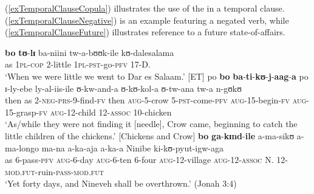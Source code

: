 \largerpage
(\ref{exTemporalClauseCopula}) illustrates the use of the  in a temporal clause. (\ref{exTemporalClauseNegative}) is an example featuring a negated verb, while (\ref{exTemporalClauseFuture}) illustrates reference to a future state-of-affairs.
\begin{exe}
\ex  \label{exTemporalClauseCopula} \gll \textbf{bo} \textbf{tʊ}-\textbf{lɪ} ba-niini tw-a-bʊʊk-ile kʊ-dalesalama\\
as \textsc{1pl}-\textsc{cop} 2-little \textsc{1pl}-\textsc{pst}-go-\textsc{pfv} 17-D.\\
\glt \lq When we were little we went to Dar es Salaam.'  [ET]
\ex \label{exTemporalClauseNegative}
\gll po \textbf{bo} \textbf{ba}-\textbf{ti}-\textbf{kʊ}-\textbf{j}-\textbf{aag}-\textbf{a} po ɪ-ly-ebe ly-al-iis-ile ʊ-kw-and-a ʊ-kʊ-kol-a ʊ-tw-ana tw-a n-gʊkʊ\\
then as 2-\textsc{neg}-\textsc{prs}-9-find-\textsc{fv} then \textsc{aug}-5-crow 5-\textsc{pst}-come-\textsc{pfv} \textsc{aug}-15-begin-\textsc{fv} \textsc{aug}-15-grasp-\textsc{fv} \textsc{aug}-12-child 12-\textsc{assoc} 10-chicken\\
\glt \lq As/while they were not finding it [needle], Crow came, beginning to catch the little children of the chickens.' [Chickens and Crow]
\ex \label{exTemporalClauseFuture} \gll \textbf{bo} \textbf{ga}-\textbf{kɪnd}-\textbf{ile} a-ma-sikʊ a-ma-longo ma-na a-ka-aja a-ka-a Ninibe ki-kʊ-pyut-igw-aga\\
as 6-pass-\textsc{pfv} \textsc{aug}-6-day \textsc{aug}-6-ten 6-four \textsc{aug}-12-village \textsc{aug}-12-\textsc{assoc} N. 12-\textsc{mod.fut}-ruin-\textsc{pass}-\textsc{mod.fut}\\
\glt \lq Yet forty days, and Nineveh shall be overthrown.' (Jonah 3:4)
\end{exe}

